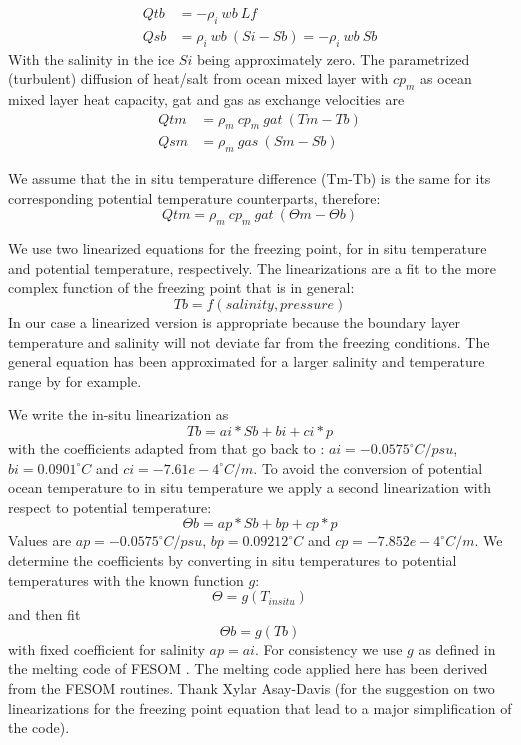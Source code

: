 \documentclass{article}
\begin{document}
\begin{align}
Qtb &= -\rho_i \ wb \ Lf \\
Qsb &= \rho_i \ wb \ (Si-Sb) = -\rho_i \ wb \ Sb
\end{align}
With the salinity in the ice $Si$ being approximately zero.
The parametrized (turbulent) diffusion of heat/salt from ocean mixed layer with
$cp_m$ as ocean mixed layer heat capacity, gat and gas as exchange velocities are
\begin{align}
Qtm &= \rho_m \ cp_m \ gat \ (Tm-Tb) \\
Qsm &= \rho_m \ gas \ (Sm-Sb)
\end{align}

We assume that the in situ temperature difference (Tm-Tb) is the same for its corresponding potential temperature counterparts, therefore:
\begin{equation}
Qtm = \rho_m \ cp_m \ gat \ (\Theta m- \Theta b)
\end{equation}

We use two linearized equations for the freezing point, for in situ temperature and potential temperature, respectively.
The linearizations are a fit to the more complex function of the freezing point that is in general:
\begin{equation}
Tb  = f(salinity,pressure)
\end{equation}
In our case a linearized version is appropriate because the boundary layer temperature and salinity will not deviate far from the freezing conditions.
The general equation has been approximated for a larger salinity and temperature range by \cite{Jackettetal2006} for example.

We write the in-situ linearization as
\begin{equation}
Tb  = ai*Sb + bi + ci*p
\end{equation}
with the coefficients adapted from \cite{Hellmeretal1998} that go back to \cite{FoldvikKvinge1974}: $ai=-0.0575 ^\circ C/psu$, $bi=0.0901 ^\circ C$ and $ci = -7.61e-4 ^\circ C/m$.
To avoid the conversion of potential ocean temperature to in situ temperature we apply a second linearization with respect to potential temperature:
\begin{equation}
\Theta b  = ap*Sb + bp + cp*p
\end{equation}
Values are $ap=-0.0575 ^\circ C/psu$, $bp=0.09212 ^\circ C$ and $cp = -7.852e-4 ^\circ C/m$.
We determine the coefficients by converting in situ temperatures to potential temperatures with the known function $g$:
\begin{equation}
\Theta = g (T_{insitu})
\end{equation}
and then fit
\begin{equation}
\Theta b= g (T b)
\end{equation}
with fixed coefficient for salinity $ap=ai$. For consistency we use $g$ as defined in the melting code of FESOM \cite{Wangetal2013}. The melting code applied here has been derived from the FESOM routines.
Thank Xylar Asay-Davis (for the suggestion on two linearizations for the freezing point equation that lead to a major simplification of the code).
\end{document}
